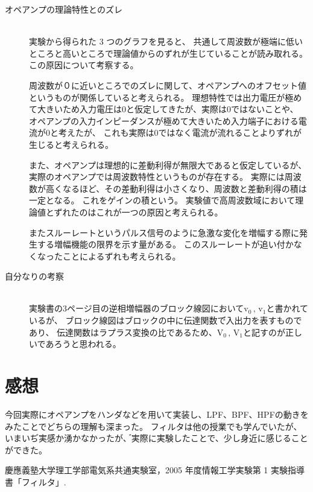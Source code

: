 \documentclass[11pt,a4j]{jsarticle}
\begin{document}
\begin{description}
  \item[オペアンプの理論特性とのズレ]\mbox{}\\
  実験から得られた 3 つのグラフを見ると、
  共通して周波数が極端に低いところと高いところで理論値からのずれが生じていることが読み取れる。
  この原因について考察する。

  周波数が０に近いところでのズレに関して、オペアンプへのオフセット値というものが関係していると考えられる。
  理想特性では出力電圧が極めて大きいため入力電圧は0と仮定してきたが、実際は0ではないことや、
  オペアンプの入力インピーダンスが極めて大きいため入力端子における電流が0と考えたが、
  これも実際は0ではなく電流が流れることよりずれが生じると考えられる。

  また、オペアンプは理想的に差動利得が無限大であると仮定しているが、
  実際のオペアンプでは周波数特性というものが存在する。
  実際には周波数が高くなるほど、その差動利得は小さくなり、周波数と差動利得の積は一定となる。
  これをゲインの積という。 実験値で高周波数域において理論値とずれたのはこれが一つの原因と考えられる。

  またスルーレートというパルス信号のように急激な変化を増幅する際に発生する増幅機能の限界を示す量がある。
  このスルーレートが追い付かなくなったことによるずれも考えられる。
  \item[自分なりの考察]\mbox{}\\
  実験書の3ページ目の逆相増幅器のブロック線図において$\mathrm{v_0 \, , \, v_1}$と書かれているが、
  ブロック線図はブロックの中に伝達関数で゙入出力を表すものであり、
  伝達関数はラプラス変換の比であるため、$\mathrm{V_0 \, , \, V_1}$と記すのが正しいであろうと思われる。
\end{description}

\section{感想}
\label{sec:感想}

今回実際にオペアンプをハンダなどを用いて実装し、LPF、BPF、HPFの動きをみたことでどちらの理解も深まった。
フィルタは他の授業でも学んでいたが、いまいぢ実感か湧かなかったが、゙実際に実験したことで、少し身近に感じることができた。



\begin{thebibliography}{99} %
 慶應義塾大学理工学部電気系共通実験室，2005 年度情報工学実験第 1 実験指導
書「フィルタ」.
\end{thebibliography}
\end{document}
